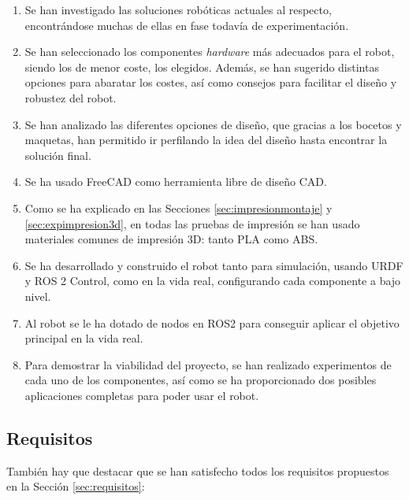 \begin{enumerate}
	\item Se han investigado las soluciones robóticas actuales al respecto, encontrándose muchas de ellas en fase todavía de experimentación.
	\item Se han seleccionado los componentes \textit{hardware} más adecuados para el robot, siendo  los de menor coste, los elegidos. Además, se han sugerido distintas opciones para abaratar los costes, así como consejos para facilitar el diseño y robustez del robot. 
	\item Se han analizado las diferentes opciones de diseño, que gracias a los bocetos y maquetas, han permitido ir perfilando la idea del diseño hasta encontrar la solución final.
	\item Se ha usado FreeCAD como herramienta libre de diseño CAD.
	\item Como se ha explicado en las Secciones \ref{sec:impresionmontaje} y \ref{sec:expimpresion3d}, en todas las pruebas de impresión se han usado materiales comunes de impresión 3D: tanto PLA como ABS.
	\item Se ha desarrollado  y construido el robot tanto para simulación, usando URDF y ROS 2 Control, como en la vida real, configurando cada componente a bajo nivel.
	\item Al robot se le ha dotado de nodos en ROS2 para conseguir aplicar el objetivo principal en la vida real.
	\item Para demostrar la viabilidad del proyecto, se han realizado experimentos de cada uno de los componentes, así como se ha proporcionado dos posibles aplicaciones completas para poder usar el robot.  
\end{enumerate}

\subsection{Requisitos}

También hay que destacar que se han satisfecho todos los requisitos propuestos en la Sección \ref{sec:requisitos}:

